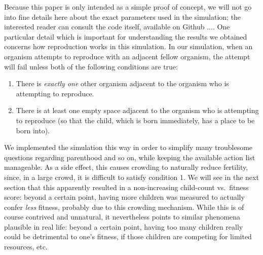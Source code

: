 \documentclass{article}
\begin{document}
Because this paper is only intended as a simple proof of concept, we will not
go into fine details here about the exact parameters used in the simulation;
the interested reader can consult the code itself, available on Github ....
One particular detail which is important for understanding the results we
obtained concerns how reproduction works in this simulation. In our simulation,
when an organism attempts to reproduce with an adjacent fellow organism, the
attempt will fail unless both of the following conditions are true:
\begin{enumerate}
    \item There is \emph{exactly one} other organism adjacent to the organism
        who is attempting to reproduce.
    \item There is at least one empty space adjacent to the organism
        who is attempting to reproduce (so that the child, which is born
        immediately, has a place to be born into).
\end{enumerate}
We implemented the simulation this way in order to simplify many troublesome
questions regarding parenthood and so on, while keeping the available action
list manageable. As a side effect, this causes crowding to naturally reduce
fertility, since, in a large crowd, it is difficult to satisfy condition 1.
We will see in the next section that this apparently resulted in a non-increasing
child-count vs.\ fitness score: beyond a certain point, having more children
was measured to actually confer \emph{less} fitness, probably due to this
crowding mechanism. While this is of course contrived and unnatural, it
nevertheless points to similar phenomena plausible in real life: beyond a certain
point, having too many children really could be detrimental to one's fitness,
if those children are competing for limited resources, etc.
\end{document}
